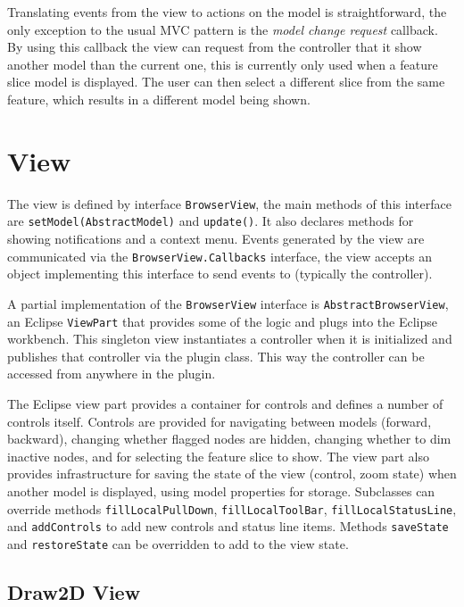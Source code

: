 Translating events from the view to actions on the model is straightforward, the only exception to the usual MVC 
pattern is the \emph{model change request} callback. By using this callback the view can request from the controller 
that it show another model than the current one, this is currently only used when a feature slice model is displayed. 
The user can then select a different slice from the same feature, which results in a different model being shown.


\section{View}

The view is defined by interface \lstinline|BrowserView|, the main methods of this interface are 
\lstinline|setModel(AbstractModel)| and \lstinline|update()|. It also declares methods for showing notifications and a 
context menu. Events generated by the view are communicated via the \lstinline|BrowserView.Callbacks| interface, the 
view accepts an object implementing this interface to send events to (typically the controller).

A partial implementation of the \lstinline|BrowserView| interface is \lstinline|AbstractBrowserView|, an Eclipse 
\lstinline|ViewPart| that provides some of the logic and plugs into the Eclipse workbench. This singleton view 
instantiates a controller when it is initialized and publishes that controller via the plugin class. This way the 
controller can be accessed from anywhere in the plugin.

The Eclipse view part provides a container for controls and defines a number of controls itself. Controls are provided 
for navigating between models (forward, backward), changing whether flagged nodes are hidden, changing whether to dim 
inactive nodes, and for selecting the feature slice to show. The view part also provides infrastructure for saving the 
state of the view (control, zoom state) when another model is displayed, using model properties for storage. Subclasses 
can override methods \lstinline|fillLocalPullDown|, \lstinline|fillLocalToolBar|, \lstinline|fillLocalStatusLine|, and 
\lstinline|addControls| to add new controls and status line items. Methods \lstinline|saveState| and 
\lstinline|restoreState| can be overridden to add to the view state.

\subsection{Draw2D View}

